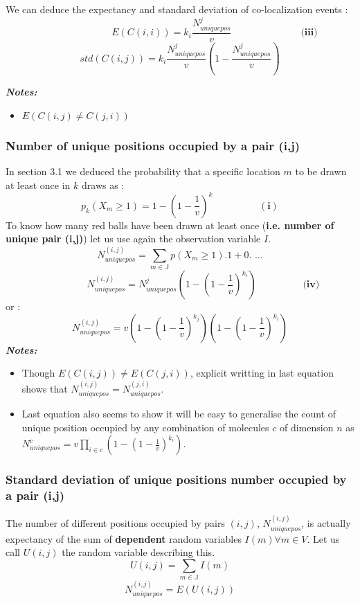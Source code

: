 \documentclass{article}  %
\begin{document}
We can deduce the expectancy and standard deviation of co-localization events :
\[
    \hspace{3cm}E(C(i,i)) = k_i\frac{N^j_{uniquepos}}{v} \hspace{3cm} \textbf{(iii)}
\]
\[
std(C(i,j)) = k_i\frac{N^j_{uniquepos}}{v}(1-\frac{N^j_{uniquepos}}{v})
\]

\textit{\textbf{Notes:}}
\begin{itemize}
    \item $E(C(i,j) \neq C(j,i))$
\end{itemize}

\subsubsection{Number of unique positions occupied by a pair (i,j)}
In section 3.1 we deduced the probability that a specific location $m$ to be drawn at least once  in $k$ draws as :
\[
p_k(X_m \geq 1) = 1-(1 - \frac{1}{v})^k \hspace{2cm} (\textbf{i})
\]
To know how many red balls have been drawn at least once (\textbf{i.e. number of unique pair (i,j)}) let us use again the observation
variable $I$.
\[
N^{(i,j)}_{uniquepos} = \sum_{m \in \mathbb{J}}p(X_m \geq 1).1 + 0. \textbf{ ...}
\]
\[
\hspace{2cm} N^{(i,j)}_{uniquepos} = N^j_{uniquepos}(1-(1-\frac{1}{v})^{k_i}) \hspace{2cm} \textbf{(iv)}
\]
or :
\[
N^{(i,j)}_{uniquepos} = v(1-(1-\frac{1}{v})^{k_j})(1-(1-\frac{1}{v})^{k_i})
\]
\textit{\textbf{Notes:}}
\begin{itemize}
    \item Though $E(C(i,j)) \neq E(C(j,i))$, explicit writting in last equation shows that $N^{(i,j)}_{uniquepos} = N^{(j,i)}_{uniquepos}$.
    \item Last equation also seems to show it will be easy to generalise the count of unique position occupied by any combination of molecules $c$ of dimension $n$
    as $N^c_{uniquepos} = v\prod_{i \in c}(1-(1-\frac{1}{v})^{k_i})$.
\end{itemize}

\subsubsection{Standard deviation of unique positions number occupied by a pair (i,j)}
The number of different positions occupied by pairs $(i,j)$, $N^{(i,j)}_{uniquepos}$, is actually expectancy of the sum of \textbf{dependent} random variables
$I(m) \forall m \in V$. Let us call $U(i,j)$ the random variable describing this.
\[
U(i,j) = \sum_{m \in \mathbb{J}}I(m)
\]
\[
N^{(i,j)}_{uniquepos} = E(U(i,j))
\]
\end{document}
